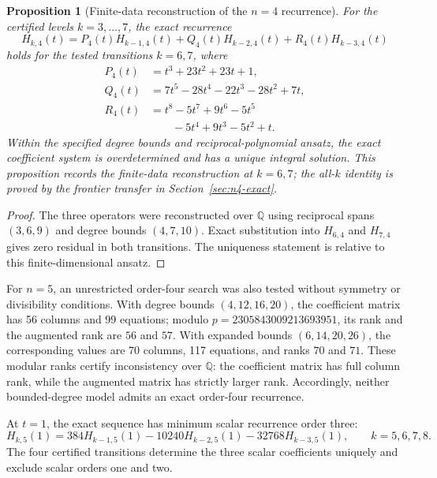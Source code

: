 \documentclass[11pt,a4paper]{article}
\newtheorem{proposition}[theorem]{Proposition}
\theoremstyle{definition}
\begin{document}
\begin{proposition}[Finite-data reconstruction of the $n=4$ recurrence]
\label{prop:recurrence-n4}
For the certified levels $k=3,\ldots,7$, the exact recurrence
\begin{equation}\label{eq:recurrence-n4}
H_{k,4}(t)
=P_4(t)H_{k-1,4}(t)
+Q_4(t)H_{k-2,4}(t)
+R_4(t)H_{k-3,4}(t)
\end{equation}
holds for the tested transitions $k=6,7$, where
\begin{align*}
P_4(t)&=t^3+23t^2+23t+1,\\
Q_4(t)&=7t^5-28t^4-22t^3-28t^2+7t,\\
R_4(t)&=t^8-5t^7+9t^6-5t^5\\
&\qquad{}-5t^4+9t^3-5t^2+t.
\end{align*}
Within the specified degree bounds and reciprocal-polynomial ansatz,
the exact coefficient system is overdetermined and has a unique integral
solution. This proposition records the finite-data reconstruction at
$k=6,7$; the all-$k$ identity is proved by the frontier transfer in
Section~\ref{sec:n4-exact}.
\end{proposition}

\begin{proof}
The three operators were reconstructed over $\mathbb{Q}$ using reciprocal
spans $(3,6,9)$ and degree bounds $(4,7,10)$. Exact substitution into
$H_{6,4}$ and $H_{7,4}$ gives zero residual in both transitions. The
uniqueness statement is relative to this finite-dimensional ansatz.
\end{proof}

For $n=5$, an unrestricted order-four search was also tested without
symmetry or divisibility conditions. With degree bounds $(4,12,16,20)$,
the coefficient matrix has 56 columns and 99 equations; modulo
$p=2305843009213693951$, its rank and the augmented rank are $56$ and
$57$. With expanded bounds $(6,14,20,26)$, the corresponding values are
70 columns, 117 equations, and ranks $70$ and $71$. These modular ranks
certify inconsistency over $\mathbb Q$: the coefficient matrix has full
column rank, while the augmented matrix has strictly larger rank.
Accordingly, neither bounded-degree model admits an exact order-four
recurrence.

At $t=1$, the exact sequence has minimum scalar recurrence order three:
\begin{equation}\label{eq:scalar-n5}
H_{k,5}(1)=384H_{k-1,5}(1)
-10240H_{k-2,5}(1)-32768H_{k-3,5}(1),
\qquad k=5,6,7,8.
\end{equation}
The four certified transitions determine the three scalar coefficients
uniquely and exclude scalar orders one and two.
\end{document}
